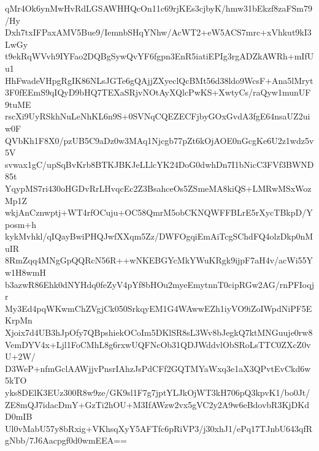qMr4Ok6ynMwHvRdLGSAWHHQcOn11c69rjKEs3cjbyK/hmw31bEkzf8zaFSm79/Hy
Dxh7txIFPaxAMV5Bue9/IemnbSHqYNhw/AcWT2+eW5ACS7mrc+xVhkut9kI3LwGy
t9ekRqWVvh9IYFao2DQBgSywQvYF6fgpn3EnR5iatiEPIg3rgADZkAWRh+mIfUu1
HhFwadeVHpgRgIK86NLsJGTe6gQAjjZXyeclQcBMt56d38ldo9WcsF+Ana5lMryt
3F0fEEmS9qIQyD9bHQ7TEXaSRjvNOtAyXQlcPwKS+XwtyCs/raQyw1munUF9tuME
rscXi9UyRSkhNuLeNhKL6n9S+0SVNqCQEZECFjbyGOxGvdA3fgE64nsaUZ2uiw0F
QVbKh1F8X0/pzUB5C9aDz0w3MAq1Njcgb77pZt6kOjAOE0nGcgKe6U2z1wdz5v5V
svwax1gC/upSqBvKrb8BTKJBKJeLLlcYK24DoG0dwhDn7I1bNicC3FVf3BWND85t
YqypMS7ri430oHGDvRrLHvqcEc2Z3BsahceOs5ZSmeMA8kiQS+LMRwMSxWozMp1Z
wkjAnCznwptj+WT4rfOCuju+OC58QmrM5obCKNQWFFBLrE5rXycTBkpD/Yposm+h
kykMvhkl/qIQayBwiPHQJwfXXqm5Zz/DWFOgqiEmAiTcgSChdFQ4olzDkp0nMuIR
8RmZqq4MNgGpQQRcN56R++wNKEBGYcMkYWuKRgk9ijpF7aH4v/acWi55Yw1H8wmH
b3azwR86Ehk0dNYHdq0feZyV4pYf8bHOu2myeEmytnnT0cipRGw2AG/rnPFIoqjr
My3Ed4pqWKwmChZVgjCk050SrkqyEM1G4WAwwEZh1iyVO9iZoIWpdNiPF5EKrpMn
Xjoix7d4UB3hJpOfy7QBpshiekOCoIm5DKlSR8sL3Wv8bJegkQ7ktMNGuuje0rw8
VemDYV4x+Ljl1FoCMhL8g6rxwUQFNcOb31QDJWddvlObSRoLsTTC0ZXcZ0vU+2W/
D3WeP+nfmGclAAWjjvPnsrIAhzJsPdCFf2GQTMYaWxq3e1aX3QPvtEvCkd6w5kTO
yks8DElK3EUz300R8w9ze/GK9sl1F7g7jptYLJkOjWT3kH706pQ3kpvK1/bo0Jt/
ZE8mQJ7idacDmY+GzTi2hOU+M3IfAWzw2vx5gVC2y2A9w6eBdovbR3KjDKdD0mIB
Ul0vMabU57y8bRxig+VKhsqXyY5AFTfc6pRiVP3/j30xhJ1/ePq17TJnbU643qfR
gNbb/7J6Aacpgf0d0wmEEA==
